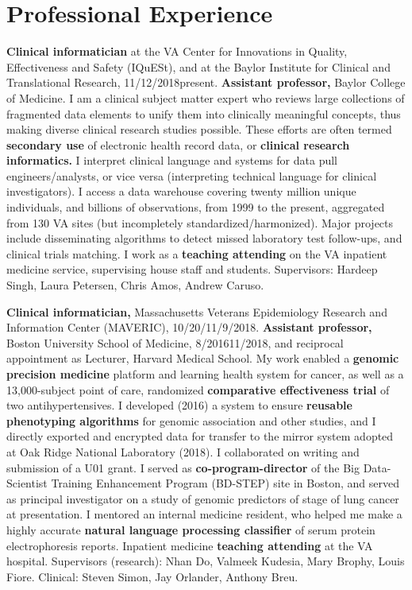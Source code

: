 \documentclass[10pt]{article}
\begin{document}
\section*{Professional Experience} %

\textbf{Clinical informatician} at the VA Center for Innovations in
Quality, Effectiveness and Safety (IQuESt), and at the Baylor
Institute for Clinical and Translational Research,
11/12/2018\ndash{}present. \textbf{Assistant professor,} Baylor
College of Medicine. I am a clinical subject matter expert who reviews
large collections of fragmented data elements to unify them into
clinically meaningful concepts, thus making diverse clinical research
studies possible.  These efforts are often termed \textbf{secondary
  use} of electronic health record data, or \textbf{clinical research
  informatics.} I interpret clinical language and systems for data
pull engineers/analysts, or vice versa (interpreting technical
language for clinical investigators). I access a data warehouse
covering twenty million unique individuals, and billions of
observations, from 1999 to the present, aggregated from 130 VA sites
(but incompletely standardized/harmonized). Major projects include
disseminating algorithms to detect missed laboratory test follow-ups,
and clinical trials matching. I work as a \textbf{teaching
  attending} on the VA inpatient medicine service, supervising house
staff and students. Supervisors: Hardeep Singh, Laura
Petersen, Chris Amos, Andrew Caruso.

\textbf{Clinical informatician,} Massachusetts Veterans Epidemiology
Research and Information Center (MAVERIC),
10/20/\ndash{}11/9/2018. \textbf{Assistant
  professor,} Boston University School of Medicine,
8/2016\ndash{}11/2018, and reciprocal appointment as Lecturer, Harvard
Medical School. My work enabled a \textbf{genomic precision medicine}
platform and learning health system for cancer, as well as a
13,000-subject point of care, randomized \textbf{comparative
  effectiveness trial} of two antihypertensives. I developed (2016) a
system to ensure \textbf{reusable phenotyping algorithms} for genomic
association and other studies, and I directly exported and encrypted
data for transfer to the mirror system adopted at Oak Ridge National
Laboratory (2018). I collaborated on writing and submission of a U01
grant. I served as \textbf{co-program-director} of the Big
Data-Scientist Training Enhancement Program (BD-STEP) site in Boston,
and served as principal investigator on a study of genomic predictors
of stage of lung cancer at presentation. I mentored an internal
medicine resident, who helped me make a highly accurate
\textbf{natural language processing classifier} of serum protein
electrophoresis reports. Inpatient medicine \textbf{teaching
  attending} at the VA hospital. Supervisors (research): Nhan Do,
Valmeek Kudesia, Mary Brophy, Louis Fiore. Clinical: Steven Simon, Jay
Orlander, Anthony Breu.
\end{document}
